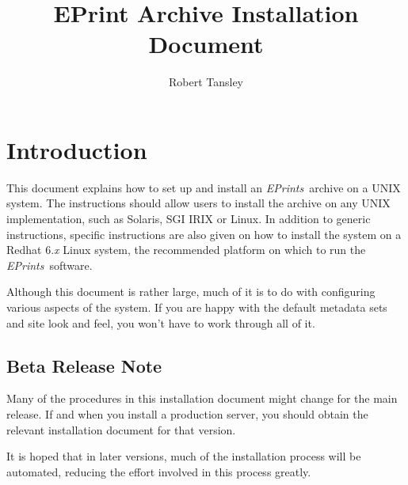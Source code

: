 \documentclass[a4paper]{article}
\title{EPrint Archive Installation Document}
\author{Robert Tansley}
\newcommand{\eprints}{\emph{EPrints}}
\begin{document}
\maketitle

\section{Introduction}

This document explains how to set up and install an \eprints\ archive on a UNIX system. The instructions should allow users to install the archive on any UNIX implementation, such as Solaris, SGI IRIX or Linux. In addition to generic instructions, specific instructions are also given on how to install the system on a Redhat 6.\emph{x} Linux system, the recommended platform on which to run the \eprints\ software.

Although this document is rather large, much of it is to do with configuring various aspects of the system. If you are happy with the default metadata sets and site look and feel, you won't have to work through all of it.


\subsection{Beta Release Note}

Many of the procedures in this installation document might change for the main release. If and when you install a production server, you should obtain the relevant installation document for that version.

It is hoped that in later versions, much of the installation process will be automated, reducing the effort involved in this process greatly.


\end{document}
